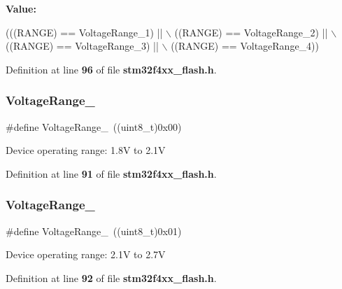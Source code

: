 {\bfseries Value\+:}
\begin{DoxyCode}
(((RANGE) == VoltageRange_1) || \(\backslash\)
                               ((RANGE) == VoltageRange_2) || \(\backslash\)
                               ((RANGE) == VoltageRange_3) || \(\backslash\)
                               ((RANGE) == VoltageRange_4))
\end{DoxyCode}


Definition at line \textbf{ 96} of file \textbf{ stm32f4xx\+\_\+flash.\+h}.

\mbox{\label{group__FLASH__Voltage__Range_ga0ed013741f9d88425fe97da49f4980c1}} 
\subsubsection{Voltage\+Range\+\_}
{\footnotesize\ttfamily \#define Voltage\+Range\+\_~((uint8\+\_\+t)0x00)}

Device operating range\+: 1.\+8V to 2.\+1V 

Definition at line \textbf{ 91} of file \textbf{ stm32f4xx\+\_\+flash.\+h}.

\mbox{\label{group__FLASH__Voltage__Range_ga4c080832b4c8c992acb645f2c39561e0}} 
\subsubsection{Voltage\+Range\+\_}
{\footnotesize\ttfamily \#define Voltage\+Range\+\_~((uint8\+\_\+t)0x01)}

Device operating range\+: 2.\+1V to 2.\+7V 

Definition at line \textbf{ 92} of file \textbf{ stm32f4xx\+\_\+flash.\+h}.

\mbox{\label{group__FLASH__Voltage__Range_gadd249fb08c69b11cea3a6b7c22865b99}} 

